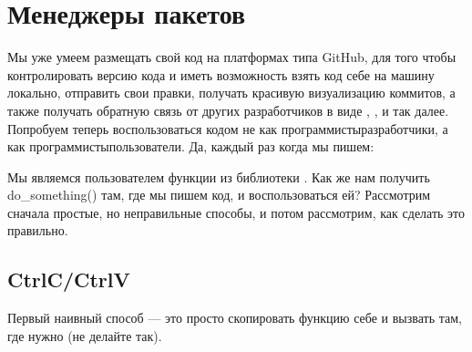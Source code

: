 \documentclass[letterpaper,10pt,russian]{sphinxmanual}
\begin{document}
\section{Менеджеры пакетов}
\label{\detokenize{educational_materials/packaging/content:id1}}\label{\detokenize{educational_materials/packaging/content::doc}}
\sphinxAtStartPar
Мы уже умеем размещать свой код на платформах типа GitHub, для того чтобы контролировать версию кода и иметь возможность взять код себе на машину локально, отправить свои правки, получать красивую визуализацию коммитов, а также получать обратную связь от других разработчиков в виде , ,  и так далее. Попробуем теперь воспользоваться кодом не как программисты\sphinxhyphen{}разработчики, а как программисты\sphinxhyphen{}пользователи. Да, каждый раз когда мы пишем:

\begin{sphinxVerbatim}[commandchars=\\\{\}]
 
\end{sphinxVerbatim}

\sphinxAtStartPar
Мы являемся пользователем функции  из библиотеки . Как же нам получить do\_something() там, где мы пишем код, и воспользоваться ей? Рассмотрим сначала простые, но неправильные способы, и потом рассмотрим, как сделать это правильно.


\subsection{Ctrl\sphinxhyphen{}C/Ctrl\sphinxhyphen{}V}
\label{\detokenize{educational_materials/packaging/content:ctrl-c-ctrl-v}}
\sphinxAtStartPar
Первый наивный способ — это просто скопировать функцию себе и вызвать там, где нужно (не делайте так).
\end{document}

